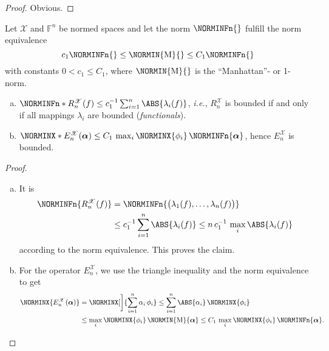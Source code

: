 \documentclass[a4paper]{paper}
\newcommand*{\SPC}[1]{{\ensuremath{\mathscr{#1}}}}
\newcommand*{\SPCX}{\SPC{X}}
\newcommand{\FIELD}{{\ensuremath{\mathbb{F}}}}
\newcommand*{\Fn}{{\ensuremath{\FIELD^n}}}
\newcommand*{\EXT}[2]{\ensuremath{E_{#1}^{#2}}}
\newcommand*{\REST}[2]{\ensuremath{R_{#1}^{#2}}}
\newcommand*{\RnX}{{\ensuremath{\REST{n}{\SPC{X}}}}}
\newcommand*{\EnX}{{\ensuremath{\EXT{n}{\SPC{X}}}}}
\newcommand{\ie}{\textsl{i.e.}\xspace}
\newcommand{\valpha}{\boldsymbol{\alpha}}
\begin{document}
\begin{proof}
 Obvious.
\end{proof}


\begin{lemma}
 \label{lemma:specif:funct:op_prop_normedspace}
 Let $\SPCX$ and $\Fn$ be normed spaces and let the norm $\NORMINFn{}$ fulfill the norm equivalence
 \begin{equation*}
  c_1 \NORMINFn{} \leq \NORMIN{\mathrm{M}}{} \leq C_1 \NORMINFn{}
 \end{equation*}
 with constants $0 < c_1 \leq C_1$, where $\NORMIN{\mathrm{M}}{}$ is the ``Manhattan''- or 1-norm.

 \begin{enumerate}[(a)]
  \item $\NORMINFn*{\RnX(f)} \leq c_1^{-1} \sum_{i=1}^n \ABS{\lambda_i(f)}$, \ie, $\RnX$ is bounded if and only if all 
  mappings $\lambda_i$ are bounded (\emph{functionals}).
  \item $\NORMINX*{\EnX(\valpha)} \leq C_1\, \max_i \NORMINX{\phi_i}\, \NORMINFn{\valpha}$, hence $\EnX$ is 
  bounded.
 \end{enumerate}
\end{lemma}
\vspace{1em}


\begin{proof}~
 \begin{enumerate}[(a)]
  \item It is
  \begin{align*}
   \NORMINFn{\RnX(f)} 
   &= \NORMINFn{\big( \lambda_1(f), \dotsc, \lambda_n(f) \big)} \\
   &\leq c_1^{-1} \sum_{i=1}^n \ABS{\lambda_i(f)} \leq n\,c_1^{-1}\, \max_i \ABS{\lambda_i(f)}
  \end{align*}
  according to the norm equivalence. This proves the claim.
  
  \item For the operator $\EnX$, we use the triangle inequality and the norm equivalence to get
  \begin{align*}
   \NORMINX{\EnX(\valpha)} 
   &= \NORMINX[\bigg]{\sum_{i=1}^n \alpha_i\, \phi_i} \leq \sum_{i=1}^n \ABS{\alpha_i}\, \NORMINX{\phi_i} \\
   &\leq \max_i \NORMINX{\phi_i}\, \NORMIN{\mathrm{M}}{\valpha} \leq C_1\, \max_i \NORMINX{\phi_i}\, 
   \NORMINFn{\valpha}.
  \end{align*}
 \end{enumerate}
\end{proof}
\end{document}
